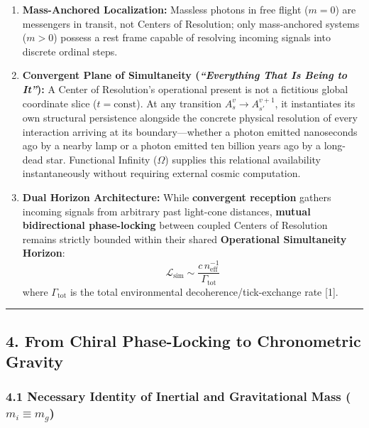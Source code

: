 \documentclass[
]{article}
\providecommand{\tightlist}{%
  \setlength{\itemsep}{0pt}\setlength{\parskip}{0pt}}
\begin{document}
\begin{enumerate}
\def\labelenumi{\arabic{enumi}.}
\tightlist
\item
  \textbf{Mass-Anchored Localization:} Massless photons in free flight
  (\(m = 0\)) are messengers in transit, not Centers of Resolution; only
  mass-anchored systems (\(m > 0\)) possess a rest frame capable of
  resolving incoming signals into discrete ordinal steps.
\item
  \textbf{Convergent Plane of Simultaneity (\emph{``Everything That Is
  Being to It''}):} A Center of Resolution's operational present is not
  a fictitious global coordinate slice (\(t = \text{const}\)). At any
  transition \(A_s^v \to A_{s'}^{v+1}\), it instantiates its own
  structural persistence alongside the concrete physical resolution of
  every interaction arriving at its boundary---whether a photon emitted
  nanoseconds ago by a nearby lamp or a photon emitted ten billion years
  ago by a long-dead star. Functional Infinity (\(\Omega\)) supplies
  this relational availability instantaneously without requiring
  external cosmic computation.
\item
  \textbf{Dual Horizon Architecture:} While \textbf{convergent
  reception} gathers incoming signals from arbitrary past light-cone
  distances, \textbf{mutual bidirectional phase-locking} between coupled
  Centers of Resolution remains strictly bounded within their shared
  \textbf{Operational Simultaneity Horizon}:
  \[\mathcal{L}_{\mathrm{sim}} \sim \frac{c \, n_{\mathrm{eff}}^{-1}}{\Gamma_{\mathrm{tot}}}\]
  where \(\Gamma_{\mathrm{tot}}\) is the total environmental
  decoherence/tick-exchange rate {[}1{]}.
\end{enumerate}

\begin{center}\rule{0.5\linewidth}{0.5pt}\end{center}

\subsection{4. From Chiral Phase-Locking to Chronometric
Gravity}\label{from-chiral-phase-locking-to-chronometric-gravity}

\subsubsection{\texorpdfstring{4.1 Necessary Identity of Inertial and
Gravitational Mass
(\(m_i \equiv m_g\))}{4.1 Necessary Identity of Inertial and Gravitational Mass (m\_i \textbackslash equiv m\_g)}}\label{necessary-identity-of-inertial-and-gravitational-mass-m_i-equiv-m_g}
\end{document}
